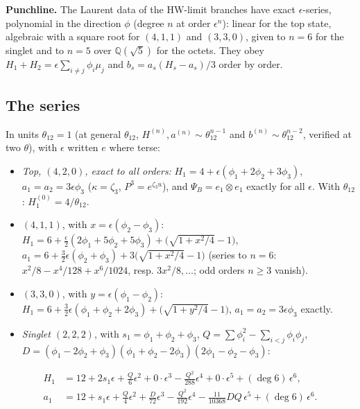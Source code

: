 \documentclass[11pt]{article}
\begin{document}
\textbf{Punchline.} The Laurent data of the HW-limit branches have exact $\epsilon$-series, polynomial in the direction $\phi$ (degree $n$ at order $\epsilon^n$): linear for the top state, algebraic with a square root for $(4,1,1)$ and $(3,3,0)$, given to $n=6$ for the singlet and to $n=5$ over $\mathbb{Q}(\sqrt5)$ for the octets.
They obey $H_1+H_2=\epsilon\sum_{i\ne j}\phi_i\mu_j$ and $b_s=a_s(H_s-a_s)/3$ order by order.

\subsection{The series}\label{sec:seriesdata}

In units $\theta_{12}=1$ (at general $\theta_{12}$, $H^{(n)},a^{(n)}\sim\theta_{12}^{n-1}$ and $b^{(n)}\sim\theta_{12}^{n-2}$, verified at two $\theta$), with $\epsilon$ written $e$ where terse:

\begin{itemize}
\item \emph{Top, $(4,2,0)$, exact to all orders:} $H_1=4+\epsilon(\phi_1+2\phi_2+3\phi_3)$, $a_1=a_2=3\epsilon\phi_3$ ($\kappa=\zeta_3$, $P^3=e^{\zeta_3u}$), and $\Psi_B=e_1\otimes e_1$ exactly for all $\epsilon$. With $\theta_{12}$: $H_1^{(0)}=4/\theta_{12}$.
\item \emph{$(4,1,1)$}, with $x=\epsilon(\phi_2-\phi_3)$: $H_1=6+\tfrac\epsilon2(2\phi_1+5\phi_2+5\phi_3)+\bigl(\sqrt{1+x^2/4}-1\bigr)$, $a_1=6+\tfrac32\epsilon(\phi_2+\phi_3)+3\bigl(\sqrt{1+x^2/4}-1\bigr)$ (series to $n=6$: $x^2/8-x^4/128+x^6/1024$, resp. $3x^2/8,\dots$; odd orders $n\ge3$ vanish).
\item \emph{$(3,3,0)$}, with $y=\epsilon(\phi_1-\phi_2)$: $H_1=6+\tfrac32\epsilon(\phi_1+\phi_2+2\phi_3)+\bigl(\sqrt{1+y^2/4}-1\bigr)$, $a_1=a_2=3\epsilon\phi_3$ exactly.
\item \emph{Singlet $(2,2,2)$}, with $s_1=\phi_1+\phi_2+\phi_3$, $Q=\sum\phi_i^2-\sum_{i<j}\phi_i\phi_j$, $D=(\phi_1-2\phi_2+\phi_3)(\phi_1+\phi_2-2\phi_3)(2\phi_1-\phi_2-\phi_3)$:
\end{itemize}

\begin{equation}
\begin{aligned}
H_1&=12+2s_1\epsilon+\tfrac{Q}{6}\epsilon^2+0\cdot\epsilon^3-\tfrac{Q^2}{288}\epsilon^4+0\cdot\epsilon^5+(\deg6)\,\epsilon^6,\\
a_1&=12+s_1\epsilon+\tfrac Q4\epsilon^2+\tfrac D{72}\epsilon^3-\tfrac{Q^2}{192}\epsilon^4-\tfrac{11}{10368}DQ\,\epsilon^5+(\deg6)\,\epsilon^6.
\end{aligned}\label{eq:singlet}
\end{equation}
\end{document}
